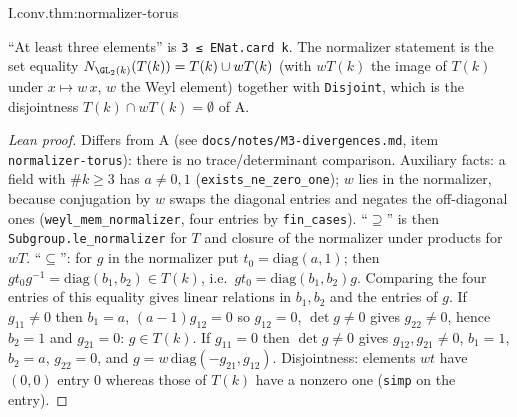 \begin{theorem}
\end{theorem}
\begin{tfformal}{I.conv.thm:normalizer-torus}
\begin{tffidelity}
``At least three elements'' is \texttt{3 ≤ ENat.card k}. The normalizer statement is the set equality $N_{\GL_2(k)}(T(k))=T(k)\cup wT(k)$ (with $wT(k)$ the image of $T(k)$ under $x\mapsto w\,x$, $w$ the Weyl element) together with \texttt{Disjoint}, which is the disjointness $T(k)\cap wT(k)=\emptyset$ of A.
\end{tffidelity}
\end{tfformal}
\begin{proof}[Lean proof]
Differs from A (see \texttt{docs/notes/M3-divergences.md}, item \texttt{normalizer-torus}): there is no trace/determinant comparison. Auxiliary facts: a field with $\#k\ge3$ has $a\ne0,1$ (\texttt{exists\_ne\_zero\_one}); $w$ lies in the normalizer, because conjugation by $w$ swaps the diagonal entries and negates the off-diagonal ones (\texttt{weyl\_mem\_normalizer}, four entries by \texttt{fin\_cases}). ``$\supseteq$'' is then \texttt{Subgroup.le\_normalizer} for $T$ and closure of the normalizer under products for $wT$. ``$\subseteq$'': for $g$ in the normalizer put $t_0=\mathrm{diag}(a,1)$; then $gt_0g^{-1}=\mathrm{diag}(b_1,b_2)\in T(k)$, i.e.\ $gt_0=\mathrm{diag}(b_1,b_2)g$. Comparing the four entries of this equality gives linear relations in $b_1,b_2$ and the entries of $g$. If $g_{11}\ne0$ then $b_1=a$, $(a-1)g_{12}=0$ so $g_{12}=0$, $\det g\ne0$ gives $g_{22}\ne0$, hence $b_2=1$ and $g_{21}=0$: $g\in T(k)$. If $g_{11}=0$ then $\det g\ne0$ gives $g_{12},g_{21}\ne0$, $b_1=1$, $b_2=a$, $g_{22}=0$, and $g=w\,\mathrm{diag}(-g_{21},g_{12})$. Disjointness: elements $wt$ have $(0,0)$ entry $0$ whereas those of $T(k)$ have a nonzero one (\texttt{simp} on the entry).
\end{proof}

